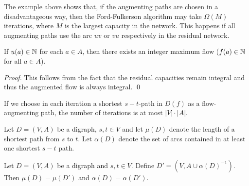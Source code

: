 \begin{center}
\end{center}
The example above shows that, if the augmenting paths are chosen in a
disadvantageous way, then the Ford-Fulkerson algorithm may take $\Omega(M)$
iterations, where $M$ is the largest capacity in the network. This
happens if all augmenting paths use the arc $uv$ or $vu$ respectively
in the residual network. 




\begin{corollary}
  If $u(a) \in \mathbb{N}$ for each $a \in A$, then there exists an integer maximum
  flow ($f(a) \in \mathbb{N}$ for all $a \in A$). 
\end{corollary}


\begin{proof}
This follows from the fact that the residual capacities remain
integral and thus the augmented flow is always integral. \qed 
\end{proof}



\begin{theorem}
\label{f:thr:10}
If we choose in each iteration a shortest $s-t$-path in $D(f)$ as a
flow-augmenting path, the number of iterations is at most $|V| \cdot|A|$. 
  
\end{theorem}

\begin{definition}
  Let $D = (V,A)$ be a digraph, $s,t \in V$  and let  $\mu(D)$ denote the
  length of a  shortest path from $s$ to $t$. Let $\alpha(D)$ denote the set
  of arcs contained in at least one shortest $s-t$ path.
\end{definition}

\begin{theorem}
  \label{f:thr:11}
  Let  $D = (V,A)$ be a digraph and  $s,t \in V$. Define $D' = (V,A \cup
  \alpha(D)^{-1})$. Then $\mu(D) = \mu(D')$ and $\alpha(D) = \alpha(D')$.
\end{theorem}


